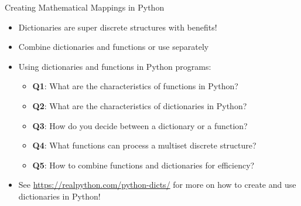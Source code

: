 \documentclass[14pt,aspectratio=169]{beamer}
\begin{document}
%
\begin{frame}{Creating Mathematical Mappings in Python}
  \begin{itemize}
    \item Dictionaries are super discrete structures with benefits!
      \vspace*{-.2in}
    \item Combine dictionaries and functions or use separately
      \vspace*{-.2in}
    \item Using dictionaries and functions in Python programs:
      \begin{itemize}
        \item {\bf Q1}: What are the characteristics of functions in Python?
        \item {\bf Q2}: What are the characteristics of dictionaries in Python?
        \item {\bf Q3}: How do you decide between a dictionary or a function?
        \item {\bf Q4}: What functions can process a multiset discrete
          structure?
        \item {\bf Q5}: How to combine functions and dictionaries for
          efficiency?
      \end{itemize}
      \vspace*{-.2in}
    \item See \url{https://realpython.com/python-dicts/} for more on how to
      create and use dictionaries in Python!
  \end{itemize}
\end{frame}
\end{document}
